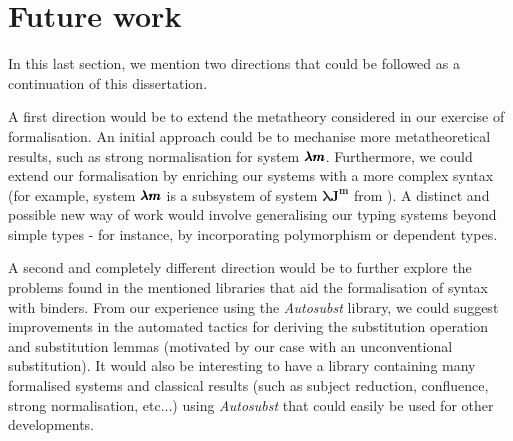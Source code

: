 \section{Future work}

In this last section, we mention two directions that could be followed as a continuation of this dissertation.


A first direction would be to extend the metatheory considered in our exercise of formalisation.
An initial approach could be to mechanise more metatheoretical results, such as strong normalisation for system $\pmb{\lambda m}$.
Furthermore, we could extend our formalisation by enriching our systems with a more complex syntax (for example, system $\pmb{\lambda m}$ is a subsystem of system $\pmb{\lambda J^m}$ from \cite{JCESLuis}).
A distinct and possible new way of work would involve generalising our typing systems beyond simple types - for instance, by incorporating polymorphism or dependent types.

A second and completely different direction would be to further explore the problems found in the mentioned libraries that aid the formalisation of syntax with binders.
From our experience using the \textit{Autosubst} library, we could suggest improvements in the automated tactics for deriving the substitution operation and substitution lemmas (motivated by our case with an unconventional substitution).
It would also be interesting to have a library containing many formalised systems and classical results (such as subject reduction, confluence, strong normalisation, etc...) using \textit{Autosubst} that could easily be used for other developments.

